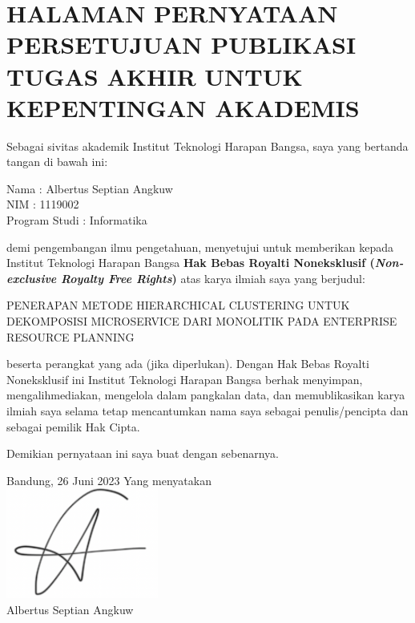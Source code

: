 \chapter*{\large HALAMAN PERNYATAAN PERSETUJUAN PUBLIKASI TUGAS AKHIR UNTUK KEPENTINGAN AKADEMIS}
	
	\noindent Sebagai sivitas akademik Institut Teknologi Harapan Bangsa, saya yang bertanda tangan di bawah ini:

	\begin{tabs}{3cm}
		\noindent Nama \tab : Albertus Septian Angkuw\\
		NIM \tab : 1119002\\
		Program Studi \tab : Informatika
	\end{tabs}
		
	\noindent demi pengembangan ilmu pengetahuan, menyetujui untuk memberikan kepada Institut Teknologi Harapan Bangsa \textbf{Hak Bebas Royalti Noneksklusif (\textit{Non-exclusive Royalty Free Rights})} atas karya ilmiah saya yang berjudul:
		
	\noindent PENERAPAN METODE HIERARCHICAL CLUSTERING UNTUK DEKOMPOSISI MICROSERVICE DARI MONOLITIK PADA ENTERPRISE RESOURCE PLANNING
		
	\noindent beserta perangkat yang ada (jika diperlukan). Dengan Hak Bebas Royalti Noneksklusif ini Institut Teknologi Harapan Bangsa berhak menyimpan, mengalihmediakan, mengelola dalam pangkalan data, dan memublikasikan karya ilmiah saya selama tetap mencantumkan nama saya sebagai penulis/pencipta dan sebagai pemilik Hak Cipta.
		
	\noindent Demikian pernyataan ini saya buat dengan sebenarnya.
	
	\noindent Bandung, 26 Juni 2023 \newline
	\noindent Yang menyatakan \\
 	\includegraphics[width=5cm]{img/sign.png}\\
	\noindent Albertus Septian Angkuw